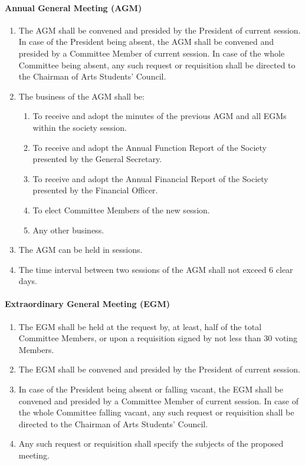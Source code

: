 \documentclass[11pt,a4paper,notitlepage]{article}
\begin{document}
	\paragraph{Annual General Meeting (AGM)} 
	\begin{enumerate}
		\item The AGM shall be convened and presided by the President of current session. In case of the President being absent, the AGM shall be convened and presided by a Committee Member of current session. In case of the whole Committee being absent, any such request or requisition shall be directed to the Chairman of Arts Students' Council. 
		\item The business of the AGM shall be: 
		\begin{enumerate}[label=\Alph*.]
			\item To receive and adopt the minutes of the previous AGM and all EGMs within the society session.
			\item To receive and adopt the Annual Function Report of the Society presented by the General Secretary. 
			\item To receive and adopt the Annual Financial Report of the Society presented by the Financial Officer. 
			\item To elect Committee Members of the new session. 
			\item Any other business. 
		\end{enumerate}
		\item The AGM can be held in sessions. 
		\item The time interval between two sessions of the AGM shall not exceed 6 clear days. 
	\end{enumerate}
	
	\paragraph{Extraordinary General Meeting (EGM)} 
	\begin{enumerate}
		\item The EGM shall be held at the request by, at least, half of the total Committee Members, or upon a requisition signed by not less than 30 voting Members. 
		\item The EGM shall be convened and presided by the President of current session. 
		\item In case of the President being absent or falling vacant, the EGM shall be convened and presided by a Committee Member of current session. In case of the whole Committee falling vacant, any such request or requisition shall be directed to the Chairman of Arts Students' Council. 
		\item Any such request or requisition shall specify the subjects of the proposed meeting. 
	\end{enumerate}
	
\end{document}
